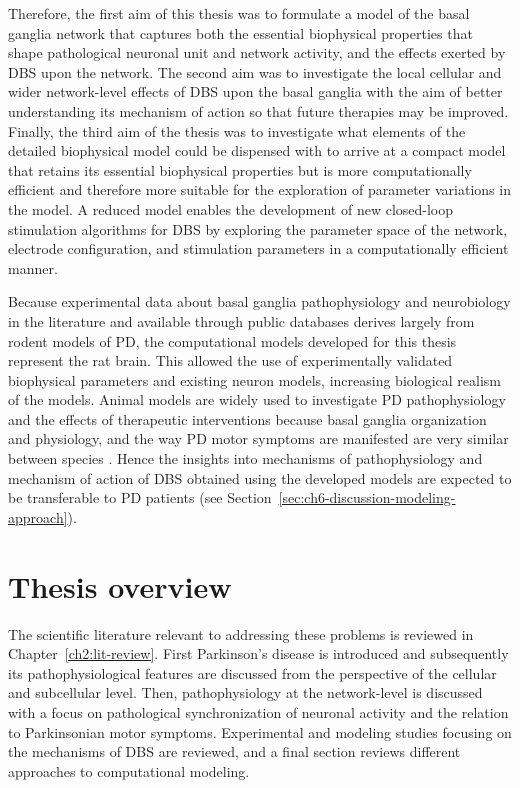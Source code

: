 %
Therefore, the first aim of this thesis was to formulate a model of the basal ganglia
network that captures both the essential biophysical properties that shape
pathological neuronal unit and network activity, and the effects exerted by DBS
upon the network. The second aim  was to investigate the
local cellular and wider network-level effects of DBS upon the basal ganglia
with the aim of better understanding its mechanism of action so that future
therapies may be improved. Finally, the third aim of the thesis was to
investigate what elements of the detailed biophysical model
could be dispensed with to arrive at a compact model that retains its essential
biophysical properties but is more computationally efficient and therefore more
suitable for the exploration of parameter variations in the model.
A reduced model enables the development of new closed-loop stimulation
algorithms for DBS by exploring the parameter space of the network,
electrode configuration, and stimulation parameters in a computationally efficient
manner.
%

%
Because experimental data about basal ganglia pathophysiology and neurobiology
in the literature and available through public databases derives largely
from rodent models of PD, the computational models developed for this thesis
represent the rat brain. This allowed the use of experimentally validated
biophysical parameters and existing neuron models, increasing biological realism
of the models. Animal models are widely used to investigate PD pathophysiology
and the effects of therapeutic interventions %
because basal ganglia organization and physiology, and the way PD motor symptoms are
manifested are very similar between species \cite{grillner_basal_2016,blesa_classic_2012}.
Hence the insights into mechanisms of pathophysiology and mechanism of action of DBS
obtained using the developed models are expected to be transferable to PD patients
(see Section~\ref{sec:ch6-discussion-modeling-approach}).

\section{Thesis overview}
%
The scientific literature relevant to addressing these problems is reviewed
in Chapter~\ref{ch2:lit-review}. First Parkinson's disease is introduced and
subsequently its pathophysiological features are discussed from the
perspective of the cellular and subcellular level. Then, pathophysiology
at the network-level is discussed with a focus on pathological synchronization
of neuronal activity and the relation to Parkinsonian motor symptoms.
Experimental and modeling studies focusing on the mechanisms of DBS are reviewed,
and a final section reviews different approaches to computational modeling.

